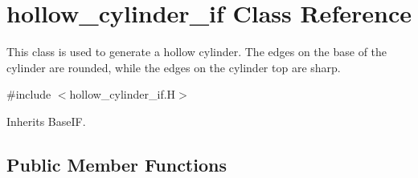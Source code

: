 \hypertarget{classhollow__cylinder__if}{}\section{hollow\+\_\+cylinder\+\_\+if Class Reference}
\label{classhollow__cylinder__if}


This class is used to generate a hollow cylinder. The edges on the base of the cylinder are rounded, while the edges on the cylinder top are sharp.  




{\ttfamily \#include $<$hollow\+\_\+cylinder\+\_\+if.\+H$>$}



Inherits Base\+IF.

\subsection*{Public Member Functions}
